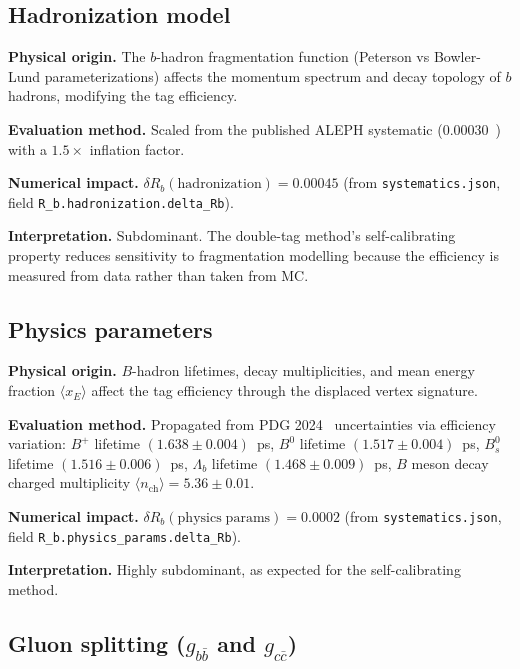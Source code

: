 \documentclass[11pt,a4paper]{article}
\begin{document}
\subsection{Hadronization model}
\label{sec:syst_hadronization}

\textbf{Physical origin.} The $b$-hadron fragmentation function (Peterson vs Bowler-Lund
parameterizations) affects the momentum spectrum and decay topology of $b$ hadrons,
modifying the tag efficiency.

\textbf{Evaluation method.} Scaled from the published ALEPH systematic
(0.00030~\cite{ALEPH:Rb:1996}) with a $1.5\times$ inflation factor.

\textbf{Numerical impact.}
$\delta R_b(\mathrm{hadronization}) = 0.00045$
(from \texttt{systematics.json}, field \texttt{R\_b.hadronization.delta\_Rb}).

\textbf{Interpretation.} Subdominant. The double-tag method's self-calibrating property
reduces sensitivity to fragmentation modelling because the efficiency is measured from
data rather than taken from MC.

\subsection{Physics parameters}
\label{sec:syst_physics}

\textbf{Physical origin.} $B$-hadron lifetimes, decay multiplicities, and mean energy
fraction $\langle x_E \rangle$ affect the tag efficiency through the displaced vertex
signature.

\textbf{Evaluation method.} Propagated from PDG 2024~\cite{PDG:2024} uncertainties
via efficiency variation:
$B^+$ lifetime $(1.638 \pm 0.004)$~ps,
$B^0$ lifetime $(1.517 \pm 0.004)$~ps,
$B_s^0$ lifetime $(1.516 \pm 0.006)$~ps,
$\Lambda_b$ lifetime $(1.468 \pm 0.009)$~ps,
$B$ meson decay charged multiplicity $\langle n_\mathrm{ch} \rangle = 5.36 \pm 0.01$.

\textbf{Numerical impact.}
$\delta R_b(\mathrm{physics\;params}) = 0.0002$
(from \texttt{systematics.json}, field \texttt{R\_b.physics\_params.delta\_Rb}).

\textbf{Interpretation.} Highly subdominant, as expected for the self-calibrating method.

\subsection{Gluon splitting ($g_{b\bar{b}}$ and $g_{c\bar{c}}$)}
\label{sec:syst_gluon}
\end{document}
